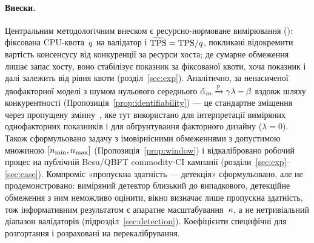 \paragraph{Внески.}
Центральним методологічним внеском є ресурсно-нормоване вимірювання (\RNM{}):
фіксована CPU-квота~$q$ на валідатор і $\widetilde{\mathrm{TPS}}=\mathrm{TPS}/q$, покликані відокремити
вартість консенсусу від конкуренції за ресурси хоста; де сумарне обмеження
лишає запас хосту, воно стабілізує показник за фіксованої квоти, хоча показник
і далі залежить від рівня квоти (розділ~\ref{sec:exp}). Аналітично, за
ненасиченої двофакторної
моделі з шумом нульового середнього
$\hat{\alpha}_{m}\xrightarrow{\mathbb{P}}\gamma\lambda-\beta$ вздовж шляху конкурентності
(Пропозиція~\ref{prop:identifiability}) --- це стандартне зміщення через
пропущену змінну~\cite{wooldridge2010}, яке тут використано для інтерпретації
виміряних однофакторних показників і для обґрунтування факторного дизайну
\RNM{} ($\lambda=0$). Також сформульовано задачу з імовірнісними обмеженнями з
допустимою множиною $[\nmin,\nmax]$ (Пропозиція~\ref{prop:window}) і
відкалібровано робочий процес на публічній Besu/QBFT commodity-CI кампанії
(розділи~\ref{sec:exp}--\ref{sec:case}). Компроміс «пропускна здатність ---
детекція» сформульовано, але не продемонстровано: виміряний детектор близький
до випадкового, детекційне обмеження з ним неможливо оцінити, вікно визначає
лише пропускна здатність, тож інформативним результатом є апаратне
масштабування~$\kappa$, а не нетривіальний діапазон валідаторів
(підрозділ~\ref{sec:detection}). Коефіцієнти специфічні для розгортання і
розраховані на перекалібрування.
